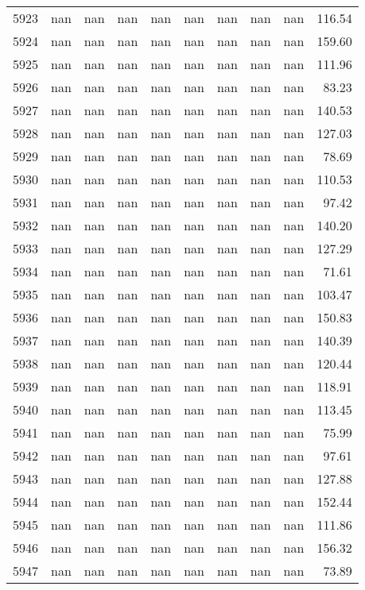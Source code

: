 \begin{tabular}{lrrrrrrrrr}
5923 & nan & nan & nan & nan & nan & nan & nan & nan & 116.54 \\
5924 & nan & nan & nan & nan & nan & nan & nan & nan & 159.60 \\
5925 & nan & nan & nan & nan & nan & nan & nan & nan & 111.96 \\
5926 & nan & nan & nan & nan & nan & nan & nan & nan & 83.23 \\
5927 & nan & nan & nan & nan & nan & nan & nan & nan & 140.53 \\
5928 & nan & nan & nan & nan & nan & nan & nan & nan & 127.03 \\
5929 & nan & nan & nan & nan & nan & nan & nan & nan & 78.69 \\
5930 & nan & nan & nan & nan & nan & nan & nan & nan & 110.53 \\
5931 & nan & nan & nan & nan & nan & nan & nan & nan & 97.42 \\
5932 & nan & nan & nan & nan & nan & nan & nan & nan & 140.20 \\
5933 & nan & nan & nan & nan & nan & nan & nan & nan & 127.29 \\
5934 & nan & nan & nan & nan & nan & nan & nan & nan & 71.61 \\
5935 & nan & nan & nan & nan & nan & nan & nan & nan & 103.47 \\
5936 & nan & nan & nan & nan & nan & nan & nan & nan & 150.83 \\
5937 & nan & nan & nan & nan & nan & nan & nan & nan & 140.39 \\
5938 & nan & nan & nan & nan & nan & nan & nan & nan & 120.44 \\
5939 & nan & nan & nan & nan & nan & nan & nan & nan & 118.91 \\
5940 & nan & nan & nan & nan & nan & nan & nan & nan & 113.45 \\
5941 & nan & nan & nan & nan & nan & nan & nan & nan & 75.99 \\
5942 & nan & nan & nan & nan & nan & nan & nan & nan & 97.61 \\
5943 & nan & nan & nan & nan & nan & nan & nan & nan & 127.88 \\
5944 & nan & nan & nan & nan & nan & nan & nan & nan & 152.44 \\
5945 & nan & nan & nan & nan & nan & nan & nan & nan & 111.86 \\
5946 & nan & nan & nan & nan & nan & nan & nan & nan & 156.32 \\
5947 & nan & nan & nan & nan & nan & nan & nan & nan & 73.89 \\

\end{tabular}
